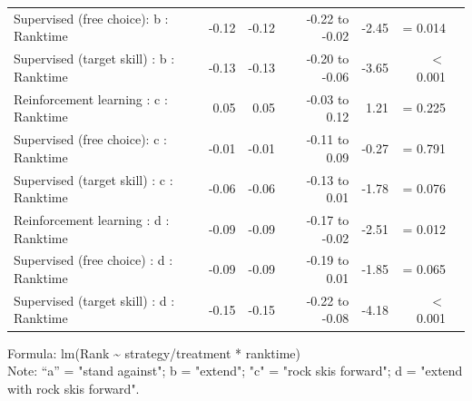\documentclass[pdflatex,sn-mathphys-num]{sn-jnl}%
\theoremstyle{thmstyleone}%
\theoremstyle{thmstyletwo}%
\theoremstyle{thmstylethree}%
\begin{document}
\begin{appendices}
\begin{longtable}{lrrrrrl}
Supervised (free choice): b : Ranktime & -0.12 & -0.12 & -0.22 to -0.02 & -2.45 &  =  0.014 \\ 
Supervised (target skill) : b : Ranktime & -0.13 & -0.13 & -0.20 to -0.06 & -3.65 &  $<$  0.001 \\ 
Reinforcement learning : c : Ranktime & 0.05 & 0.05 & -0.03 to 0.12 & 1.21 &  =  0.225 \\ 
Supervised (free choice): c : Ranktime & -0.01 & -0.01 & -0.11 to 0.09 & -0.27 &  =  0.791 \\ 
Supervised (target skill) : c : Ranktime & -0.06 & -0.06 & -0.13 to 0.01 & -1.78 &  =  0.076 \\ 
Reinforcement learning : d : Ranktime & -0.09 & -0.09 & -0.17 to -0.02 & -2.51 &  =  0.012 \\ 
Supervised (free choice) : d : Ranktime & -0.09 & -0.09 & -0.19 to 0.01 & -1.85 &  =  0.065 \\ 
Supervised (target skill) : d : Ranktime & -0.15 & -0.15 & -0.22 to -0.08 & -4.18 &  $<$  0.001 \\ 
\bottomrule
\end{longtable}
\begin{minipage}{\linewidth}
Formula: lm(Rank \textasciitilde{} strategy/treatment * ranktime) \\
Note: “a” = "stand against"; b = "extend"; "c" = "rock skis forward"; d = "extend with rock skis forward". 
\end{minipage}




\end{appendices}
\end{document}
